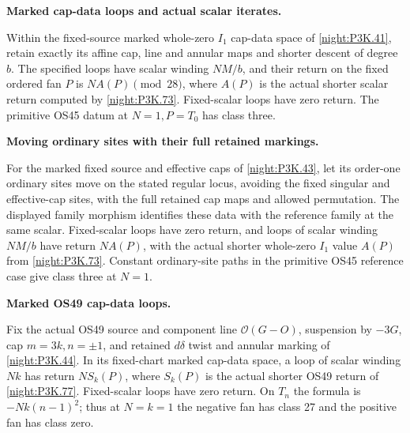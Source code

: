 \begin{proposition}\hypertarget{tag-01UG}{}\label{iv:correction:P3K.41}

\textbf{Marked cap-data loops and actual scalar iterates.}\par
Within the fixed-source marked whole-zero \(I_1\)
cap-data space of \cref{night:P3K.41}, retain exactly its affine
cap, line and annular maps and shorter descent of degree \(b\).
The specified loops have scalar winding \(NM/b\), and their
return on the fixed ordered fan \(P\) is
\(N A(P)\pmod{28}\), where \(A(P)\) is the actual shorter
scalar return computed by \cref{night:P3K.73}. Fixed-scalar
loops have zero return. The primitive OS45 datum at
\(N=1,P=T_0\) has class three.
\end{proposition}

\begin{proposition}\hypertarget{tag-01UH}{}\label{iv:correction:P3K.43}

\textbf{Moving ordinary sites with their full retained markings.}\par
For the marked fixed source and effective caps of
\cref{night:P3K.43}, let its order-one ordinary sites move on
the stated regular locus, avoiding the fixed singular and
effective-cap sites, with the full retained cap maps and allowed
permutation. The displayed family morphism identifies these
data with the reference family at the same scalar. Fixed-scalar
loops have zero return, and loops of scalar winding \(NM/b\)
have return \(N A(P)\), with the actual shorter whole-zero
\(I_1\) value \(A(P)\) from \cref{night:P3K.73}.
Constant ordinary-site paths in the primitive OS45 reference
case give class three at \(N=1\).
\end{proposition}

\begin{proposition}\hypertarget{tag-01UI}{}\label{iv:correction:P3K.44}

\textbf{Marked OS49 cap-data loops.}\par
Fix the actual OS49 source and component line
\(\mathcal O(G-O)\), suspension by \(-3G\), cap
\(m=3k,n=\pm1\), and retained \(d\delta\) twist and
annular marking of \cref{night:P3K.44}. In its fixed-chart
marked cap-data space, a loop of scalar winding \(Nk\)
has return \(N S_k(P)\), where \(S_k(P)\) is the actual
shorter OS49 return of \cref{night:P3K.77}. Fixed-scalar
loops have zero return. On \(T_n\) the formula is
\(-Nk(n-1)^2\); thus at \(N=k=1\) the negative fan has
class 27 and the positive fan has class zero.
\end{proposition}

